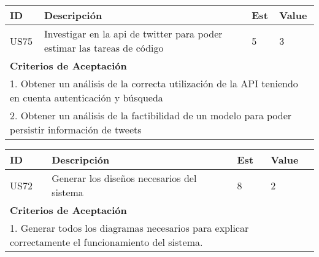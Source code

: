 \documentclass[a4paper,8pt]{article}
\begin{document}
\bigskip
\begin{tabular}{|p{1cm}|p{10cm}|p{1cm}|p{1cm}|}
\hline
\hline
\textbf{ID}&\textbf{Descripción}&\textbf{Est}&\textbf{Value}\\
\hline
\hline
US75&Investigar en la api de twitter para poder estimar las tareas de código&5&3\\
\hline
\hline
\multicolumn{4}{|p{13cm}|}{ \textbf{Criterios de Aceptación}} \\
\hline
\hline
\multicolumn{4}{|p{13cm}|}{1. Obtener un análisis de la correcta utilización de la API teniendo en cuenta autenticación y búsqueda}\\
\multicolumn{4}{|p{13cm}|}{2. Obtener un análisis de la factibilidad de un modelo para poder persistir información de tweets}\\
\hline
\hline
\end{tabular}

\bigskip
\begin{tabular}{|p{1cm}|p{10cm}|p{1cm}|p{1cm}|}
\hline
\hline
\textbf{ID}&\textbf{Descripción}&\textbf{Est}&\textbf{Value}\\
\hline
\hline
US72&Generar los diseños necesarios del sistema&8&2\\
\hline
\hline
\multicolumn{4}{|p{13cm}|}{ \textbf{Criterios de Aceptación}} \\
\hline
\hline
\multicolumn{4}{|p{13cm}|}{1. Generar todos los diagramas necesarios para explicar correctamente el funcionamiento del sistema.}\\
\hline
\hline
\end{tabular}
\end{document}
